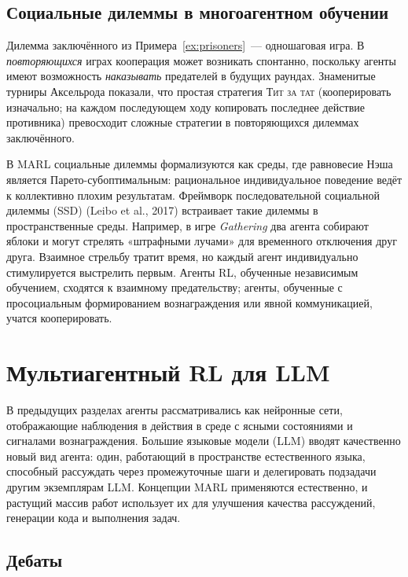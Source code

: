 \subsection{Социальные дилеммы в многоагентном обучении}

Дилемма заключённого из Примера~\ref{ex:prisoners}~--- одношаговая
игра. В \emph{повторяющихся} играх кооперация может возникать спонтанно,
поскольку агенты имеют возможность \emph{наказывать} предателей в будущих
раундах. Знаменитые турниры Аксельрода показали, что простая
стратегия \textsc{Тит за тат} (кооперировать
изначально; на каждом последующем ходу копировать последнее действие противника)
превосходит сложные стратегии в повторяющихся дилеммах заключённого.

В MARL социальные дилеммы формализуются как
среды, где равновесие Нэша является Парето-субоптимальным: рациональное
индивидуальное поведение ведёт к коллективно плохим результатам.
Фреймворк последовательной социальной дилеммы (SSD)
(Leibo et al., 2017) встраивает такие дилеммы в пространственные
среды. Например, в игре \emph{Gathering} два агента
собирают яблоки и могут стрелять «штрафными лучами» для временного отключения
друг друга. Взаимное стрельбу тратит время, но каждый агент индивидуально
стимулируется выстрелить первым. Агенты RL, обученные независимым
обучением, сходятся к взаимному предательству; агенты, обученные с просоциальным
формированием вознаграждения или явной коммуникацией, учатся кооперировать.

\section{Мультиагентный RL для LLM}
\label{sec:marl-llms}

В предыдущих разделах агенты рассматривались как нейронные сети, отображающие
наблюдения в действия в среде с ясными состояниями и сигналами вознаграждения.
Большие языковые модели (LLM)
вводят качественно новый вид агента: один, работающий в
пространстве естественного языка, способный рассуждать через промежуточные шаги и
делегировать подзадачи другим экземплярам LLM. Концепции MARL применяются
естественно, и растущий массив работ использует их для улучшения
качества рассуждений, генерации кода и выполнения задач.

\subsection{Дебаты}

